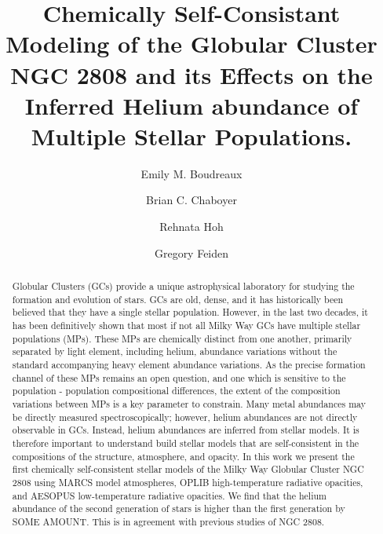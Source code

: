 \documentclass[twocolumn,linenumbers]{src/aastex631}
\begin{document}
\title{Chemically Self-Consistant Modeling of the Globular Cluster NGC 2808 and its Effects on the Inferred Helium abundance of Multiple Stellar Populations.}


\author[0000-0002-2600-7513]{Emily M. Boudreaux}

\author[0000-0003-3096-4161]{Brian C. Chaboyer}

\author{Rehnata Hoh}

\author[0000-0002-2012-7215]{Gregory Feiden}


\begin{abstract}
	Globular Clusters (GCs) provide a unique astrophysical laboratory for
	studying the formation and evolution of stars. GCs are old, dense, and it
	has historically been believed that they have a single stellar population. However, in the
	last two decades, it has been definitively shown that most if not all Milky
	Way GCs have multiple stellar populations (MPs). These MPs are chemically
	distinct from one another, primarily separated by light element, including helium, abundance
	variations without the standard accompanying heavy element abundance
	variations. As the precise formation channel of these MPs remains
	an open question, and one which is sensitive to the population - population
	compositional differences, the extent of the composition
	variations between MPs is a key parameter to constrain. Many metal abundances may be
	directly measured spectroscopically; however, helium abundances are not
	directly observable in GCs. Instead, helium abundances are inferred from
	stellar models. It is therefore important to understand build stellar
	models that are self-consistent in the compositions of the structure,
	atmosphere, and opacity. In this work we present the first chemically
	self-consistent stellar models of the Milky Way Globular Cluster NGC 2808 using MARCS model atmospheres, OPLIB high-temperature radiative opacities, and AESOPUS low-temperature radiative opacities.
	We find that the helium abundance of the second generation of stars is
	higher than the first generation by {\color{red} SOME AMOUNT}.
	{\color{blue} This is in agreement with previous studies of NGC 2808.}
\end{abstract}
\end{document}
